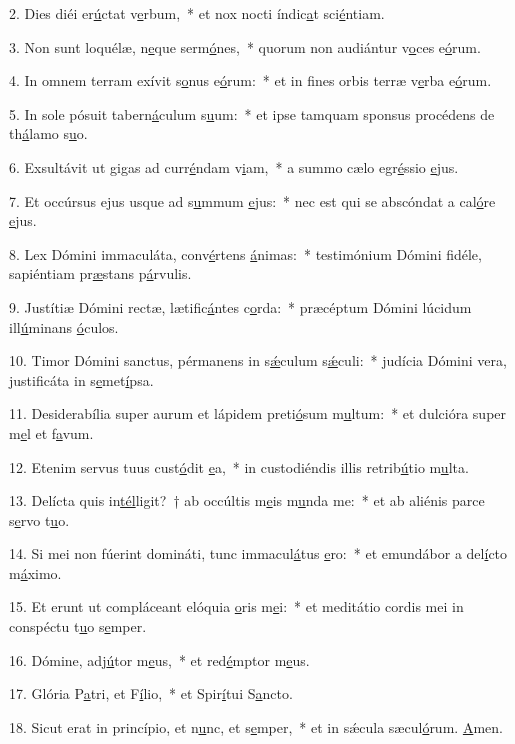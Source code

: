 2. Dies diéi er\uline{ú}ctat v\uline{e}rbum,~* et nox nocti índic\uline{a}t sci\uline{é}ntiam.\par 
3. Non sunt loquélæ, n\uline{e}que serm\uline{ó}nes,~* quorum non audiántur v\uline{o}ces e\uline{ó}rum.\par 
4. In omnem terram exívit s\uline{o}nus e\uline{ó}rum:~* et in fines orbis terræ v\uline{e}rba e\uline{ó}rum.\par 
5. In sole pósuit tabern\uline{á}culum s\uline{u}um:~* et ipse tamquam sponsus procédens de th\uline{á}lamo s\uline{u}o.\par 
6. Exsultávit ut gigas ad curr\uline{é}ndam v\uline{i}am,~* a summo cælo egr\uline{é}ssio \uline{e}jus.\par 
7. Et occúrsus ejus usque ad s\uline{u}mmum \uline{e}jus:~* nec est qui se abscóndat a cal\uline{ó}re \uline{e}jus.\par 
8. Lex Dómini immaculáta, conv\uline{é}rtens \uline{á}nimas:~* testimónium Dómini fidéle, sapiéntiam pr\uline{æ}stans p\uline{á}rvulis.\par 
9. Justítiæ Dómini rectæ, lætific\uline{á}ntes c\uline{o}rda:~* præcéptum Dómini lúcidum ill\uline{ú}minans \uline{ó}culos.\par 
10. Timor Dómini sanctus, pérmanens in s\uline{ǽ}culum s\uline{ǽ}culi:~* judícia Dómini vera, justificáta in s\uline{e}met\uline{í}psa.\par 
11. Desiderabília super aurum et lápidem preti\uline{ó}sum m\uline{u}ltum:~* et dulcióra super m\uline{e}l et f\uline{a}vum.\par 
12. Etenim servus tuus cust\uline{ó}dit \uline{e}a,~* in custodiéndis illis retrib\uline{ú}tio m\uline{u}lta.\par 
13. Delícta quis in\uline{tél}ligit?~† ab occúltis m\uline{e}is m\uline{u}nda me:~* et ab aliénis parce s\uline{e}rvo t\uline{u}o.\par 
14. Si mei non fúerint domináti, tunc immacul\uline{á}tus \uline{e}ro:~* et emundábor a del\uline{í}cto m\uline{á}ximo.\par 
15. Et erunt ut compláceant elóquia \uline{o}ris m\uline{e}i:~* et meditátio cordis mei in conspéctu t\uline{u}o s\uline{e}mper.\par 
16. Dómine, adj\uline{ú}tor m\uline{e}us,~* et red\uline{é}mptor m\uline{e}us.\par 
17. Glória P\uline{a}tri, et F\uline{í}lio,~* et Spir\uline{í}tui S\uline{a}ncto.\par 
18. Sicut erat in princípio, et n\uline{u}nc, et s\uline{e}mper,~* et in sǽcula sæcul\uline{ó}rum. \uline{A}men.\par 
